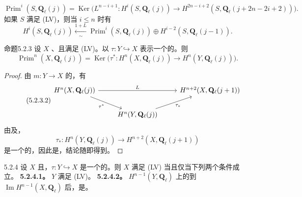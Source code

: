 \begin{equation}\tag{5.2.2.2}
\operatorname{Prim}^i(S,\mathbf Q_\ell(j))=\operatorname{Ker}\bigl(L^{n-i+1}:H^i(S,\mathbf Q_\ell(j))\to H^{2n-i+2}(S,\mathbf Q_\ell(j+2n-2i+2))\bigr).
\end{equation}
如果 $S$ 满足 (LV)，则当 $i\leq n$ 时有
\begin{equation}\tag{5.2.2.3}
H^i(S,\mathbf Q_\ell(j))\xleftarrow[\sim]{1+L}\operatorname{Prim}^i(S,\mathbf Q_\ell(j))\oplus H^{i-2}(S,\mathbf Q_\ell(j-1)).
\end{equation}
\begin{SGAresult}{命题}{5.2.3}
设 $X$ 、且满足 (LV)。以 $\tau:Y\hookrightarrow X$ 表示一个的。则
\begin{equation}\tag{5.2.3.1}\operatorname{Prim}^n(X,\mathbf Q_\ell(j))=\operatorname{Ker}\bigl(\tau^*:H^n(X,\mathbf Q_\ell(j))\to H^n(Y,\mathbf Q_\ell(j))\bigr).\end{equation}
\end{SGAresult}
\begin{proof}
由 $m:Y\to X$ 的，有
\begin{equation}\tag{5.2.3.2}
\begin{tikzcd}
H^n(X,\mathbf Q_\ell(j))\arrow[rr,"L"]\arrow[dr,"\tau^*"']&&H^{n+2}(X,\mathbf Q_\ell(j+1))\\
&H^n(Y,\mathbf Q_\ell(j))\arrow[ur,"\tau_*"']&
\end{tikzcd}
\end{equation}
由及，
\[\tau_*:H^n(Y,\mathbf Q_\ell(j))\longrightarrow H^{n+2}(X,\mathbf Q_\ell(j+1))\]
是一个的，因此是，结论随即得到。
\end{proof}
\begin{SGAresult}{}{5.2.4}
设 $X$ 且，$\tau:Y\hookrightarrow X$ 是一个的。则 $X$ 满足 (LV) 当且仅当下列两个条件成立。
\textbf{5.2.4.1。} $Y$ 满足 (LV)。
\textbf{5.2.4.2。} $H^{n-1}(Y,\mathbf Q_\ell)$ 上的到 $\operatorname{Im}H^{n-1}(X,\mathbf Q_\ell)$ 后，是。
\end{SGAresult}
